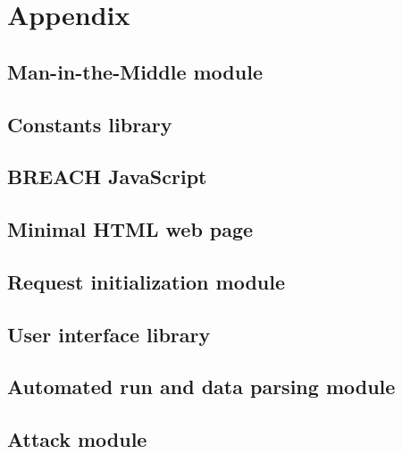 \chapter{Appendix}\label{ch:appendix}

\section{Man-in-the-Middle module}\label{sec:connect_py}


\section{Constants library}\label{sec:constants_py}


\section{BREACH JavaScript}\label{sec:evil_js}


\section{Minimal HTML web page}\label{sec:index_html}


\section{Request initialization module}\label{sec:hillclimbing_py}


\section{User interface library}\label{sec:io_library_py}


\section{Automated run and data parsing module}\label{sec:parse_py}


\section{Attack module}\label{sec:io_library_py}

